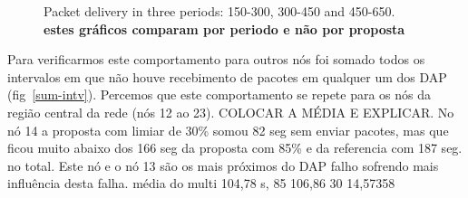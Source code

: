 \documentclass[conference]{IEEEtran}
\begin{document}
\begin  {figure}[htb]
\begin{minipage}[b]{.91\linewidth}
\centering
{}


\end{minipage}
\caption{Packet delivery in three periods: 150-300, 300-450 and 450-650. \textbf{estes gráficos comparam por periodo e não por proposta}}
\label{fases}
\end{figure}

Para verificarmos este comportamento para outros nós foi somado todos os intervalos em que não houve recebimento de pacotes em qualquer um dos DAP (fig~\ref{sum-intv}). Percemos que este comportamento se repete para  os nós da região central da rede (nós 12 ao 23). COLOCAR A MÉDIA E EXPLICAR.  No nó 14 a proposta com limiar de 30\% somou 82 seg sem enviar pacotes, mas que ficou muito abaixo dos 166 seg da proposta com 85\% e da referencia com 187 seg. no total. Este nó e o nó 13 são os mais próximos do DAP  falho sofrendo mais influência desta falha.  média do multi 104,78 s, 85 106,86  30 14,57358
\end{document}
